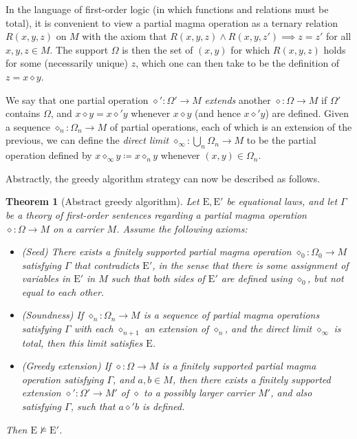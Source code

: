 \documentclass[10pt,a4paper]{amsart}
\newtheorem{theorem}{Theorem}
\newcommand{\E}{\mathrm{E}}
\newcommand{\nmodels}{\not\models}
\newcommand{\op}{\diamond}
\begin{document}
In the language of first-order logic (in which functions and relations must be total), it is convenient to view a partial magma operation as a ternary relation $R(x,y,z)$ on $M$ with the axiom that $R(x,y,z) \wedge R(x,y,z') \implies z=z'$ for all $x,y,z \in M$.  The support $\Omega$ is then the set of $(x,y)$ for which $R(x,y,z)$ holds for some (necessarily unique) $z$, which one can then take to be the definition of $z = x \op y$.

We say that one partial operation $\op' \colon \Omega' \to M$ \emph{extends} another $\op \colon \Omega \to M$ if $\Omega'$ contains $\Omega$, and $x \op y = x \op' y$ whenever $x \op y$ (and hence $x \op' y$) are defined. Given a sequence $\op_n \colon \Omega_n \to M$ of partial operations, each of which is an extension of the previous, we can define the \emph{direct limit} $\op_\infty \colon \bigcup_n \Omega_n \to M$ to be the partial operation defined by $x \op_\infty y \coloneqq x \op_n y$ whenever $(x,y) \in \Omega_n$.

Abstractly, the greedy algorithm strategy can now be described as follows.

\begin{theorem}[Abstract greedy algorithm]\label{greedy-abstract} Let $\E,{\E'}$ be equational laws, and let $\Gamma$ be a theory of first-order sentences regarding a partial magma operation $\op \colon \Omega \to M$ on a carrier $M$.  Assume the following axioms:
  \setlength{\parskip}{0pt}
\begin{itemize}
  \item[(i)] (Seed) There exists a finitely supported partial magma operation $\op_0 \colon \Omega_0 \to M$ satisfying $\Gamma$ that contradicts ${\E'}$, in the sense that there is some assignment of variables in ${\E'}$ in $M$ such that both sides of ${\E'}$ are defined using $\op_0$, but not equal to each other.
  \item[(ii)]  (Soundness)  If $\op_n \colon \Omega_n \to M$ is a sequence of partial magma operations satisfying $\Gamma$ with each $\op_{n+1}$ an extension of $\op_n$, and the direct limit $\op_\infty$ is total, then this limit satisfies $\E$.
  \item[(iii)] (Greedy extension)  If $\op \colon \Omega \to M$ is a finitely supported partial magma operation satisfying $\Gamma$, and $a,b \in M$, then there exists a finitely supported extension $\op' \colon \Omega' \to M'$ of $\op$ to a possibly larger carrier $M'$, and also satisfying $\Gamma$, such that $a \op' b$ is defined.
\end{itemize}
Then $\E \nmodels {\E'}$.
\end{theorem}
\end{document}
